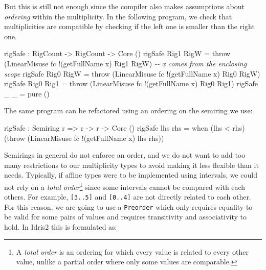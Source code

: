 \documentclass[
]{article}
\newenvironment{Shaded}{}{}
\newcommand{\CommentTok}[1]{\textcolor[rgb]{0.38,0.63,0.69}{\textit{#1}}}
\newcommand{\DataTypeTok}[1]{\textcolor[rgb]{0.56,0.13,0.00}{#1}}
\newcommand{\FunctionTok}[1]{\textcolor[rgb]{0.02,0.16,0.49}{#1}}
\newcommand{\NormalTok}[1]{#1}
\newcommand{\OperatorTok}[1]{\textcolor[rgb]{0.40,0.40,0.40}{#1}}
\newcommand{\OtherTok}[1]{\textcolor[rgb]{0.00,0.44,0.13}{#1}}
\begin{document}
But this is still not enough since the compiler also makes assumptions
about \emph{ordering} within the multiplicity. In the following program,
we check that multiplicities are compatible by checking if the left one
is smaller than the right one.

\begin{Shaded}
\begin{Highlighting}[]

\NormalTok{rigSafe }\OperatorTok{:} \DataTypeTok{RigCount} \OtherTok{{-}\textgreater{}} \DataTypeTok{RigCount} \OtherTok{{-}\textgreater{}} \DataTypeTok{Core}\NormalTok{ ()}
\NormalTok{  rigSafe }\DataTypeTok{Rig1} \DataTypeTok{RigW} \OtherTok{=}\NormalTok{ throw }
\NormalTok{    (}\DataTypeTok{LinearMisuse}\NormalTok{ fc }\OperatorTok{!}\NormalTok{(getFullName x) }\DataTypeTok{Rig1} \DataTypeTok{RigW}\NormalTok{)}
    \CommentTok{{-}{-} \textasciigrave{}x\textasciigrave{} comes from the enclosing scope}
\NormalTok{rigSafe }\DataTypeTok{Rig0} \DataTypeTok{RigW} \OtherTok{=}\NormalTok{ throw}
\NormalTok{    (}\DataTypeTok{LinearMisuse}\NormalTok{ fc }\OperatorTok{!}\NormalTok{(getFullName x) }\DataTypeTok{Rig0} \DataTypeTok{RigW}\NormalTok{)}
\NormalTok{rigSafe }\DataTypeTok{Rig0} \DataTypeTok{Rig1} \OtherTok{=}\NormalTok{ throw }
\NormalTok{    (}\DataTypeTok{LinearMisuse}\NormalTok{ fc }\OperatorTok{!}\NormalTok{(getFullName x) }\DataTypeTok{Rig0} \DataTypeTok{Rig1}\NormalTok{)}
\NormalTok{rigSafe \_ \_ }\OtherTok{=} \FunctionTok{pure}\NormalTok{ ()}
\end{Highlighting}
\end{Shaded}

The same program can be refactored using an ordering on the semiring we
use:

\begin{Shaded}
\begin{Highlighting}[]
\NormalTok{rigSafe }\OperatorTok{:} \DataTypeTok{Semiring}\NormalTok{ r }\OtherTok{=\textgreater{}}\NormalTok{ r }\OtherTok{{-}\textgreater{}}\NormalTok{ r }\OtherTok{{-}\textgreater{}} \DataTypeTok{Core}\NormalTok{ ()}
\NormalTok{rigSafe lhs rhs }\OtherTok{=} 
\NormalTok{  when (lhs }\OperatorTok{\textless{}}\NormalTok{ rhs)}
\NormalTok{       (throw (}\DataTypeTok{LinearMisuse}\NormalTok{ fc }\OperatorTok{!}\NormalTok{(getFullName x) lhs rhs))}
\end{Highlighting}
\end{Shaded}

Semirings in general do not enforce an order, and we do not want to add
too many restrictions to our multiplicity types to avoid making it less
flexible than it needs. Typically, if affine types were to be
implemented using intervals, we could not rely on a \emph{total
order}\footnote{A \emph{total order} is an ordering for which every
  value is related to every other value, unlike a partial order where
  only some values are comparable.} since some intervals cannot be
compared with each others. For example, \texttt{{[}3..5{]}} and
\texttt{{[}0..4{]}} are not directly related to each other. For this
reason, we are going to use a \texttt{Preorder} which only requires
equality to be valid for some pairs of values and requires transitivity
and associativity to hold. In Idris2 this is formulated as:
\end{document}
